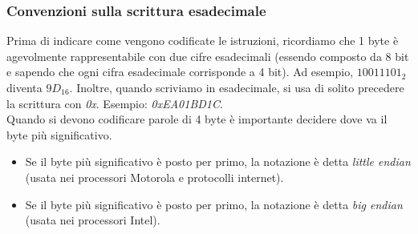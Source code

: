 \documentclass[class=book, crop=false]{standalone}
\begin{document}
\subsubsection{Convenzioni sulla scrittura esadecimale}
Prima di indicare come vengono codificate le istruzioni, ricordiamo che 1 byte è agevolmente rappresentabile con due cifre esadecimali (essendo composto da 8 bit e sapendo che ogni cifra esadecimale corrisponde a 4 bit). Ad esempio, \(1001 1101_{2}\) diventa \(9D_{16}\). Inoltre, quando scriviamo in esadecimale, si usa di solito precedere la scrittura con \emph{0x}. Esempio: \emph{0xEA01BD1C}.\\
Quando si devono codificare parole di 4 byte è importante decidere dove va il byte più significativo.
\begin{itemize}
	\item Se il byte più significativo è posto per primo, la notazione è detta \emph{little endian} (usata nei processori Motorola e protocolli internet).
	\item Se il byte più significativo è posto per primo, la notazione è detta \emph{big endian} (usata nei processori Intel).
\end{itemize}
\end{document}
